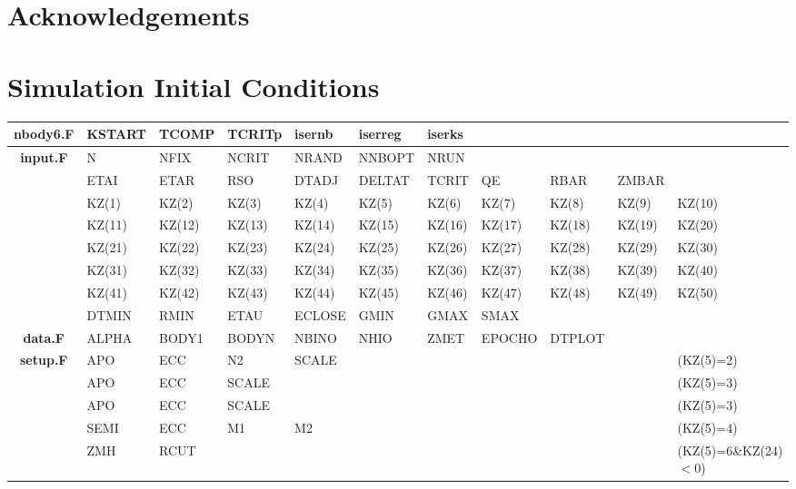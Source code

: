 \documentclass[twocolumn]{aastex62}
\begin{document}
\section{Acknowledgements}\label{sec:acknowledgements}



\appendix

\section{Simulation Initial Conditions}\label{apx:params}

\begin{table}[ht]
    \centering
    \begin{tabular}{c | l l l l l l l l l l}
        \hline
        \hline
        \textbf{nbody6.F} & KSTART & TCOMP & TCRITp & isernb & iserreg & iserks \\
        \hline
        \textbf{input.F} & N & NFIX & NCRIT & NRAND & NNBOPT & NRUN \\
        & ETAI & ETAR & RSO & DTADJ & DELTAT & TCRIT & QE & RBAR & ZMBAR \\
        & KZ(1) & KZ(2) & KZ(3) & KZ(4) & KZ(5) & KZ(6) & KZ(7) & KZ(8) & KZ(9) & KZ(10) \\
        & KZ(11) & KZ(12) & KZ(13) & KZ(14) & KZ(15) & KZ(16) & KZ(17) & KZ(18) & KZ(19) & KZ(20) \\
        & KZ(21) & KZ(22) & KZ(23) & KZ(24) & KZ(25) & KZ(26) & KZ(27) & KZ(28) & KZ(29) & KZ(30) \\
        & KZ(31) & KZ(32) & KZ(33) & KZ(34) & KZ(35) & KZ(36) & KZ(37) & KZ(38) & KZ(39) & KZ(40) \\
        & KZ(41) & KZ(42) & KZ(43) & KZ(44) & KZ(45) & KZ(46) & KZ(47) & KZ(48) & KZ(49) & KZ(50) \\
        & DTMIN & RMIN & ETAU & ECLOSE & GMIN & GMAX & SMAX \\
        \hline
        \textbf{data.F} & ALPHA & BODY1 & BODYN & NBINO & NHIO & ZMET & EPOCHO & DTPLOT \\
        \hline
        \textbf{setup.F} & APO & ECC & N2 & SCALE & & & & & &  (KZ(5)=2) \\
        & APO & ECC & SCALE & & & & & & & (KZ(5)=3) \\
        & APO & ECC & SCALE & & & & & & &  (KZ(5)=3) \\
        & SEMI & ECC & M1 & M2 & & & & & &  (KZ(5)=4) \\
        & ZMH & RCUT & & & & & & &  & (KZ(5)=6\&KZ(24)$<$0) \\

\end{tabular}
\end{table}
\end{document}

